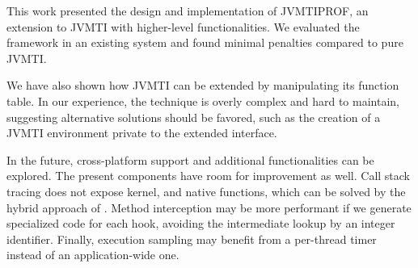 \label{cap:conclusion}

This work presented the design and implementation of JVMTIPROF, an extension to JVMTI with higher-level functionalities. We evaluated the framework in an existing system and found minimal penalties compared to pure JVMTI.

We have also shown how JVMTI can be extended by manipulating its function table. In our experience, the technique is overly complex and hard to maintain, suggesting alternative solutions should be favored, such as the creation of a JVMTI environment private to the extended interface.

In the future, cross-platform support and additional functionalities can be explored. The present components have room for improvement as well. Call stack tracing does not expose kernel, and native functions, which can be solved by the hybrid approach of . Method interception may be more performant if we generate specialized code for each hook, avoiding the intermediate lookup by an integer identifier. Finally, execution sampling may benefit from a per-thread timer instead of an application-wide one.
